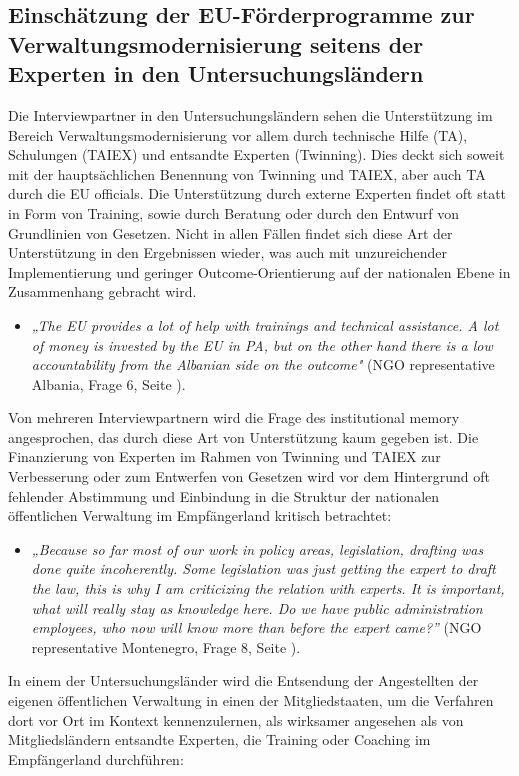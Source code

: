 \subsection{Einschätzung der EU-Förderprogramme zur Verwaltungsmodernisierung seitens der Experten in den Untersuchungsländern }
Die Interviewpartner in den Untersuchungsländern sehen die Unterstützung im Bereich Verwaltungsmodernisierung vor allem durch technische Hilfe (TA), Schulungen (TAIEX) und entsandte Experten (Twinning). Dies deckt sich soweit mit der hauptsächlichen Benennung von Twinning und TAIEX, aber auch TA durch die EU officials. Die Unterstützung durch externe Experten findet oft statt in Form von Training, sowie durch Beratung oder durch den Entwurf von Grundlinien von Gesetzen. Nicht in allen Fällen findet sich diese Art der Unterstützung in den Ergebnissen wieder, was auch mit unzureichender Implementierung und geringer Outcome-Orientierung auf der nationalen Ebene in Zusammenhang gebracht wird.
\begin{itemize}[label={}]
\item \textit{„The EU provides a lot of help with trainings and technical assistance. A lot of money is invested by the EU in PA, but on the other hand there is a low accountability from the Albanian side on the outcome"} (NGO representative Albania, Frage 6, Seite \pageref{sec:par view}).
\end{itemize}
Von mehreren Interviewpartnern wird die Frage des institutional memory angesprochen, das durch diese Art von Unterstützung kaum gegeben ist. Die Finanzierung von Experten im Rahmen von Twinning und TAIEX zur Verbesserung oder zum Entwerfen von Gesetzen wird vor dem Hintergrund oft fehlender Abstimmung und Einbindung in die Struktur der nationalen öffentlichen Verwaltung im Empfängerland kritisch betrachtet:
\begin{itemize}[label={}]
\item \textit{„Because so far most of our work in policy areas, legislation, drafting was done quite incoherently. Some legislation was just getting the expert to draft the law, this is why I am criticizing the relation with experts. It is important, what will really stay as knowledge here. Do we have public administration employees, who now will know more than before the expert came?”} (NGO representative Montenegro, Frage 8, Seite \pageref{sec:par technical}).
\end{itemize}
In einem der Untersuchungsländer wird die Entsendung der Angestellten der eigenen öffentlichen Verwaltung in einen der Mitgliedstaaten, um die Verfahren dort vor Ort im Kontext kennenzulernen, als wirksamer angesehen als von Mitgliedsländern entsandte Experten, die Training oder Coaching im Empfängerland durchführen:
